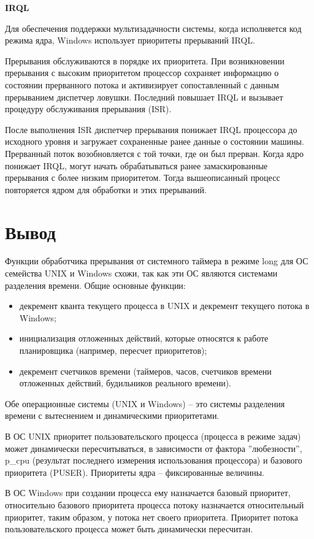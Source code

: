 \documentclass[a4paper,14pt,russian]{extreport}
\begin{document}
	\textbf{IRQL}
	
	Для обеспечения поддержки мультизадачности системы, когда исполняется код режима ядра, Windows использует приоритеты прерываний IRQL.
	
	Прерывания обслуживаются в порядке их приоритета.
	При возникновении прерывания с высоким приоритетом процессор сохраняет информацию о состоянии прерванного потока и активизирует сопоставленный с данным прерыванием диспетчер ловушки.
	Последний повышает IRQL и вызывает процедуру обслуживания прерывания (ISR).
	
	После выполнения ISR диспетчер прерывания понижает IRQL процессора до исходного уровня и загружает сохраненные ранее данные о состоянии машины.
	Прерванный поток возобновляется с той точки, где он был прерван.
	Когда ядро понижает IRQL, могут начать обрабатываться ранее замаскированные прерывания с более низким приоритетом.
	Тогда вышеописанный процесс повторяется ядром для обработки и этих прерываний.
	
	\section{Вывод}
	Функции обработчика прерывания от системного таймера в режиме long для ОС семейства UNIX и Windows схожи, так как эти ОС являются системами разделения времени.
	Общие основные функции:
	\begin{itemize}
		\item декремент кванта текущего процесса в UNIX и декремент текущего потока в Windows;
		\item инициализация отложенных действий, которые относятся к работе планировщика (например, пересчет приоритетов);
		\item декремент счетчиков времени (таймеров, часов, счетчиков времени
		отложенных действий, будильников реального времени).
	\end{itemize}

	Обе операционные системы (UNIX и Windows) – это системы разделения времени с вытеснением и динамическими приоритетами.
	
	В ОС UNIX приоритет пользовательского процесса (процесса в режиме задач) может динамически пересчитываться, в зависимости от фактора ”любезности”, p\_cpu (результат последнего измерения использования процессора) и базового приоритета (PUSER).
	Приоритеты ядра – фиксированные величины.
	
	В ОС Windows при создании процесса ему назначается базовый приоритет, относительно базового приоритета процесса потоку назначается относительный приоритет, таким образом, у потока нет своего приоритета.
	Приоритет потока пользовательского процесса может быть динамически пересчитан.
	
\end{document}
